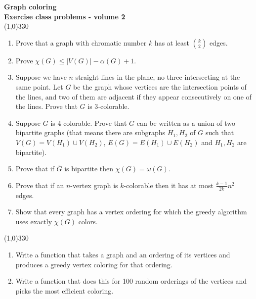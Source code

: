 \documentclass[a4paper]{article}
\begin{document}
\pagestyle{empty}
\begin{center}
	{\Large\bf Graph coloring}\\
	{\large\bf Exercise class problems - volume 2}\\
	\line(1,0){330}
\end{center}

\begin{enumerate}
\item Prove that a graph with chromatic number $k$ has at least ${k\choose 2}$ edges.
\item Prove $\chi(G)\leq |V(G)|-\alpha(G)+1$.
\item Suppose we have $n$ straight lines in the plane, no three intersecting at the same point. Let $G$ be the graph whose vertices are the intersection points of the lines, and two of them are adjacent if they appear consecutively on one of the lines. Prove that $G$ is $3$-colorable.
\item Suppose $G$ is $4$-colorable. Prove that $G$ can be written as a union of two bipartite graphs (that means there are subgraphs $H_1,H_2$ of $G$ such that $V(G)=V(H_1)\cup V(H_2)$, $E(G)=E(H_1)\cup E(H_2)$ and $H_1,H_2$ are bipartite).
\item Prove that if $\overline{G}$ is bipartite then $\chi(G)=\omega(G)$.
\item Prove that if an $n$-vertex graph is $k$-colorable then it has at most $\frac{k-1}{2k}n^2$ edges.
\item Show that every graph has a vertex ordering for which the greedy algorithm uses exactly $\chi(G)$ colors.
\end{enumerate}

\line(1,0){330}
\begin{enumerate}
\item Write a function that takes a graph and an ordering of its vertices and produces a greedy vertex coloring for that ordering.
\item Write a function that does this for 100 random orderings of the vertices and picks the most efficient coloring.
\end{enumerate}
\end{document}
